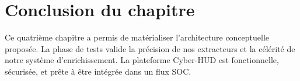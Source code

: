 \section{Conclusion du chapitre}
Ce quatrième chapitre a permis de matérialiser l'architecture conceptuelle proposée. La phase de tests valide la précision de nos extracteurs et la célérité de notre système d'enrichissement. La plateforme Cyber-HUD est fonctionnelle, sécurisée, et prête à être intégrée dans un flux SOC.
